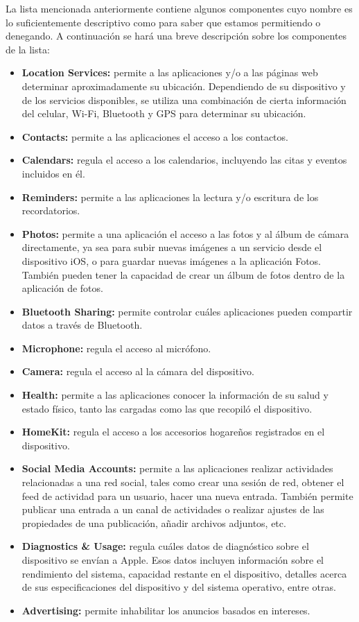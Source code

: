 La lista mencionada anteriormente contiene algunos componentes cuyo nombre es lo suficientemente descriptivo como para saber que estamos permitiendo o denegando. A continuación se hará una breve descripción sobre los componentes de la lista:
\begin{itemize}
	\item \textbf{Location Services:} permite a las aplicaciones y/o a las páginas web determinar aproximadamente su ubicación. Dependiendo de su dispositivo y de los servicios disponibles, se utiliza una combinación de cierta información del celular, Wi-Fi, Bluetooth y GPS para determinar su ubicación.
	\item \textbf{Contacts:} permite a las aplicaciones el acceso a los contactos.
	\item \textbf{Calendars:} regula el acceso a los calendarios, incluyendo las citas y eventos incluidos en él.
	\item \textbf{Reminders:} permite a las aplicaciones la lectura y/o escritura de los recordatorios.
	\item \textbf{Photos:} permite a una aplicación el acceso a las fotos y al álbum de cámara directamente, ya sea para subir nuevas imágenes a un servicio desde el dispositivo iOS, o para guardar nuevas imágenes a la aplicación Fotos. También pueden tener la capacidad de crear un álbum de fotos dentro de la aplicación de fotos.
	\item \textbf{Bluetooth Sharing:} permite controlar cuáles aplicaciones pueden compartir datos a través de Bluetooth.
	\item \textbf{Microphone:} regula el acceso al micrófono.
	\item \textbf{Camera:} regula el acceso al la cámara del dispositivo.
	\item \textbf{Health:} permite a las aplicaciones conocer la información de su salud y estado físico, tanto las cargadas como las que recopiló el dispositivo.
	\item \textbf{HomeKit:} regula el acceso a los accesorios hogareños registrados en el dispositivo.			
	\item \textbf{Social Media Accounts:} permite a las aplicaciones realizar actividades relacionadas a una red social, tales como crear una sesión de red, obtener el feed de actividad para un usuario, hacer una nueva entrada. También permite publicar una entrada a un canal de actividades o realizar ajustes de las propiedades de una publicación, añadir archivos adjuntos, etc.
	\item \textbf{Diagnostics \& Usage:} regula cuáles datos de diagnóstico sobre el dispositivo se envían a Apple. Esos datos incluyen información sobre el rendimiento del sistema, capacidad restante en el dispositivo, detalles acerca de sus especificaciones del dispositivo y del sistema operativo, entre otras.
	\item \textbf{Advertising:} permite inhabilitar los anuncios basados en intereses.
\end{itemize}
\newpage

